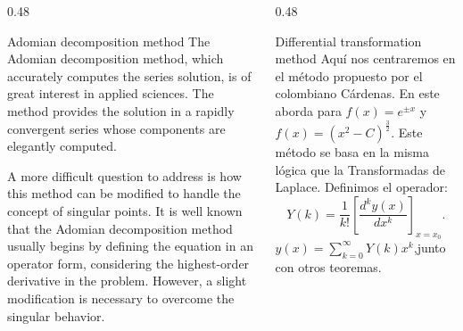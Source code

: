 \begin{frame}
    \begin{columns}[t]
        \begin{column}{0.48\textwidth}
            \begin{block}{Adomian decomposition method}
                The Adomian decomposition method, which accurately computes the series solution, is of great interest in applied sciences.
                The method provides the solution in a rapidly convergent series whose components are elegantly computed.

                A more difficult question to address is how this method can be modified to handle the concept of singular points.
                It is well known that the Adomian decomposition method usually begins by defining the equation in an operator form,
                considering the highest-order derivative in the problem.
                However, a slight modification is necessary to overcome the singular behavior.

            \end{block}
        \end{column}
        \begin{column}{0.48\textwidth}
            \begin{block}{Differential transformation method}
                Aquí nos centraremos en el método propuesto por el colombiano Cárdenas.
                En este aborda para $f(x)=e^{\pm x}$ y $f(x)=(x^2-C)^{\frac{3}{2}}$.
                Este método se basa en la misma lógica que la Transformadas de Laplace.
                Definimos el operador:
                $$Y(k)=\frac{1}{k!}[\frac{d^ky(x)}{dx^k}]_{x=x_0}.$$
                $y(x)=\sum_{k=0}^{\infty}Y(k)x^k$,junto con otros teoremas.
            \end{block}
        \end{column}
    \end{columns}
\end{frame}

